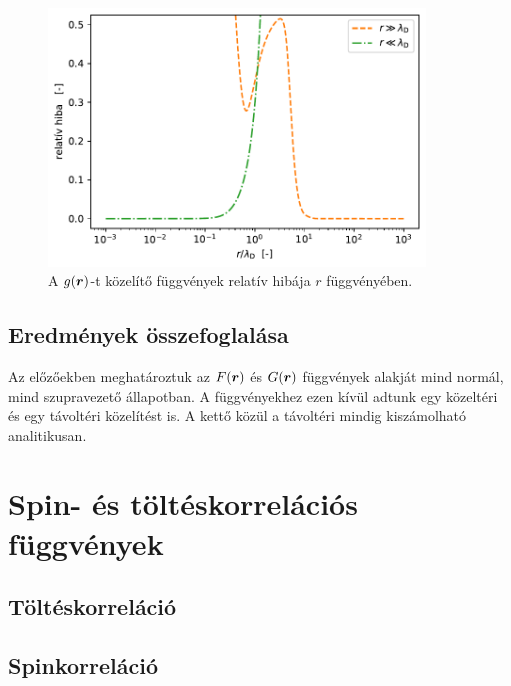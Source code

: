 \documentclass[a4paper,12pt,titlepage]{article}
\newcommand{\RR}{{\vb*{r}}}
\begin{document}
\begin{figure}[h!]
	\centering
	\includegraphics[width=10cm]{G_sc_error.pdf}
	\caption{A $g(\RR)$-t közelítő függvények relatív hibája $r$ függvényében.}
	\label{G-sc-error-fig}
\end{figure}

\subsection{Eredmények összefoglalása}

Az előzőekben meghatároztuk az $F(\RR)$ és $G(\RR)$ függvények alakját mind normál, mind szupravezető állapotban.  A függvényekhez ezen kívül adtunk egy közeltéri és egy távoltéri közelítést is.  A kettő közül a távoltéri mindig kiszámolható analitikusan.


\section{Spin- és töltéskorrelációs függvények}

\subsection{Töltéskorreláció}
\subsection{Spinkorreláció}




\begin{thebibliography}{}
\end{thebibliography}
\end{document}
